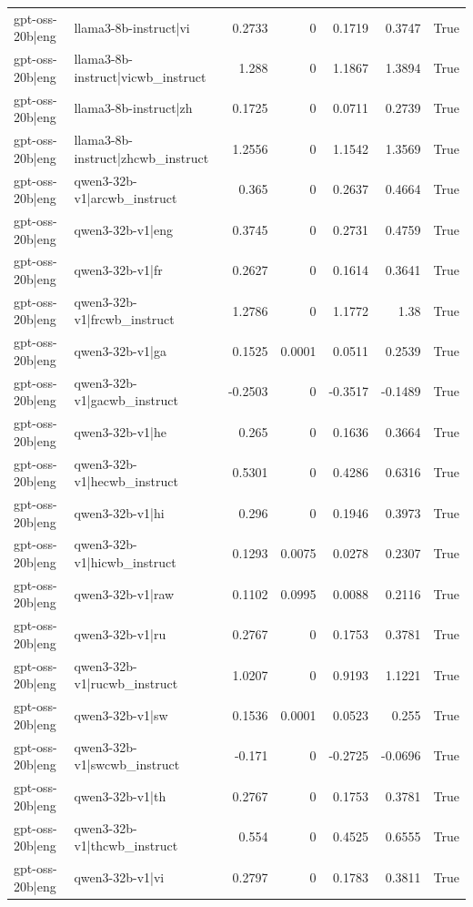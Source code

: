 \begin{table}
\begin{tabular}{l l r r r r l}
gpt-oss-20b|eng & llama3-8b-instruct|vi & 0.2733 & 0 & 0.1719 & 0.3747 & True \\
gpt-oss-20b|eng & llama3-8b-instruct|vicwb_instruct & 1.288 & 0 & 1.1867 & 1.3894 & True \\
gpt-oss-20b|eng & llama3-8b-instruct|zh & 0.1725 & 0 & 0.0711 & 0.2739 & True \\
gpt-oss-20b|eng & llama3-8b-instruct|zhcwb_instruct & 1.2556 & 0 & 1.1542 & 1.3569 & True \\
gpt-oss-20b|eng & qwen3-32b-v1|arcwb_instruct & 0.365 & 0 & 0.2637 & 0.4664 & True \\
gpt-oss-20b|eng & qwen3-32b-v1|eng & 0.3745 & 0 & 0.2731 & 0.4759 & True \\
gpt-oss-20b|eng & qwen3-32b-v1|fr & 0.2627 & 0 & 0.1614 & 0.3641 & True \\
gpt-oss-20b|eng & qwen3-32b-v1|frcwb_instruct & 1.2786 & 0 & 1.1772 & 1.38 & True \\
gpt-oss-20b|eng & qwen3-32b-v1|ga & 0.1525 & 0.0001 & 0.0511 & 0.2539 & True \\
gpt-oss-20b|eng & qwen3-32b-v1|gacwb_instruct & -0.2503 & 0 & -0.3517 & -0.1489 & True \\
gpt-oss-20b|eng & qwen3-32b-v1|he & 0.265 & 0 & 0.1636 & 0.3664 & True \\
gpt-oss-20b|eng & qwen3-32b-v1|hecwb_instruct & 0.5301 & 0 & 0.4286 & 0.6316 & True \\
gpt-oss-20b|eng & qwen3-32b-v1|hi & 0.296 & 0 & 0.1946 & 0.3973 & True \\
gpt-oss-20b|eng & qwen3-32b-v1|hicwb_instruct & 0.1293 & 0.0075 & 0.0278 & 0.2307 & True \\
gpt-oss-20b|eng & qwen3-32b-v1|raw & 0.1102 & 0.0995 & 0.0088 & 0.2116 & True \\
gpt-oss-20b|eng & qwen3-32b-v1|ru & 0.2767 & 0 & 0.1753 & 0.3781 & True \\
gpt-oss-20b|eng & qwen3-32b-v1|rucwb_instruct & 1.0207 & 0 & 0.9193 & 1.1221 & True \\
gpt-oss-20b|eng & qwen3-32b-v1|sw & 0.1536 & 0.0001 & 0.0523 & 0.255 & True \\
gpt-oss-20b|eng & qwen3-32b-v1|swcwb_instruct & -0.171 & 0 & -0.2725 & -0.0696 & True \\
gpt-oss-20b|eng & qwen3-32b-v1|th & 0.2767 & 0 & 0.1753 & 0.3781 & True \\
gpt-oss-20b|eng & qwen3-32b-v1|thcwb_instruct & 0.554 & 0 & 0.4525 & 0.6555 & True \\
gpt-oss-20b|eng & qwen3-32b-v1|vi & 0.2797 & 0 & 0.1783 & 0.3811 & True \\

\end{tabular}
\end{table}
